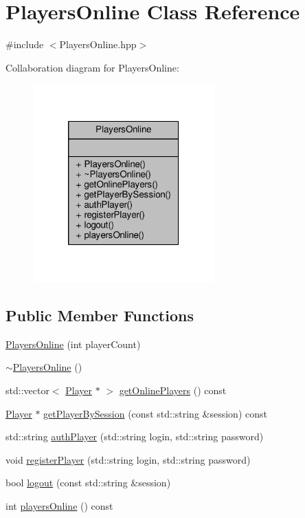 \hypertarget{class_players_online}{\section{Players\-Online Class Reference}
\label{class_players_online}
}


{\ttfamily \#include $<$Players\-Online.\-hpp$>$}



Collaboration diagram for Players\-Online\-:
\nopagebreak
\begin{figure}[H]
\begin{center}
\leavevmode
\includegraphics[width=198pt]{class_players_online__coll__graph}
\end{center}
\end{figure}
\subsection*{Public Member Functions}
\begin{DoxyCompactItemize}
\item 
\hyperlink{class_players_online_a8496d232e48655c31e1f74539f11c985}{Players\-Online} (int player\-Count)
\item 
\hyperlink{class_players_online_a2446f8f355a04a40b06ce17032b9c7a1}{$\sim$\-Players\-Online} ()
\item 
std\-::vector$<$ \hyperlink{struct_player}{Player} $\ast$ $>$ \hyperlink{class_players_online_ab68bbbd25086eb09f875c7773cc784e6}{get\-Online\-Players} () const 
\item 
\hyperlink{struct_player}{Player} $\ast$ \hyperlink{class_players_online_a12d773bb368cdcb3fb6137fc19805281}{get\-Player\-By\-Session} (const std\-::string \&session) const 
\item 
std\-::string \hyperlink{class_players_online_a5b778414970f89fa01e999c9200c7001}{auth\-Player} (std\-::string login, std\-::string password)
\item 
void \hyperlink{class_players_online_a26463b293d6c3c38ff600f4b363283cc}{register\-Player} (std\-::string login, std\-::string password)
\item 
bool \hyperlink{class_players_online_a3469d271cd5b7ff8f5e7cbab8ff31b6d}{logout} (const std\-::string \&session)
\item 
int \hyperlink{class_players_online_acace980a0794f56eecab5ddf01ff51c7}{players\-Online} () const 
\end{DoxyCompactItemize}


